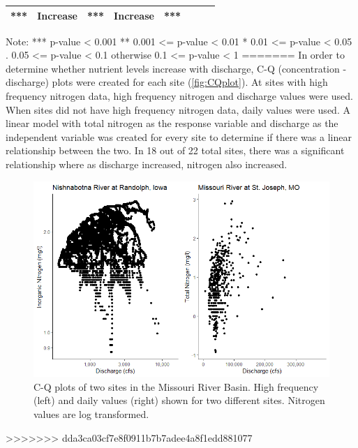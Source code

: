 \documentclass[12pt,]{article}
\makeatletter
\def\maxwidth{\ifdim\Gin@nat@width>\linewidth\linewidth\else\Gin@nat@width\fi}
\makeatother
\begin{document}
\begin{longtable}[]{@{}cccccccc@{}}
\begin{minipage}[t]{0.13\columnwidth}
***\strut
\end{minipage} & \begin{minipage}[t]{0.08\columnwidth}\centering
Increase\strut
\end{minipage} & \begin{minipage}[t]{0.16\columnwidth}\centering
***\strut
\end{minipage} & \begin{minipage}[t]{0.09\columnwidth}\centering
Increase\strut
\end{minipage} & \begin{minipage}[t]{0.13\columnwidth}\centering
***\strut
\end{minipage}\tabularnewline
\bottomrule
\end{longtable}

Note: *** p-value \textless{} 0.001 ** 0.001 \textless{}= p-value
\textless{} 0.01 * 0.01 \textless{}= p-value \textless{} 0.05 . 0.05
\textless{}= p-value \textless{} 0.1 otherwise 0.1 \textless{}= p-value
\textless{} 1
=======
In order to determine whether nutrient levels increase with discharge,
C-Q (concentration - discharge) plots were created for each site
(\autoref{fig:CQplot}). At sites with high frequency nitrogen data, high
frequency nitrogen and discharge values were used. When sites did not
have high frequency nitrogen data, daily values were used. A linear
model with total nitrogen as the response variable and discharge as the
independent variable was created for every site to determine if there
was a linear relationship between the two. In 18 out of 22 total sites,
there was a significant relationship where as discharge increased,
nitrogen also increased.

\begin{figure}[H]
\includegraphics[width=\maxwidth]{../Figures/CQplots} \caption{\label{fig:CQplot} C-Q plots of two sites in the Missouri River Basin. High frequency (left) and daily values (right) shown for two different sites. Nitrogen values are log transformed.}\label{fig:CQplot}
\end{figure}
>>>>>>> dda3ca03cf7e8f0911b7b7adee4a8f1edd881077
\end{document}

